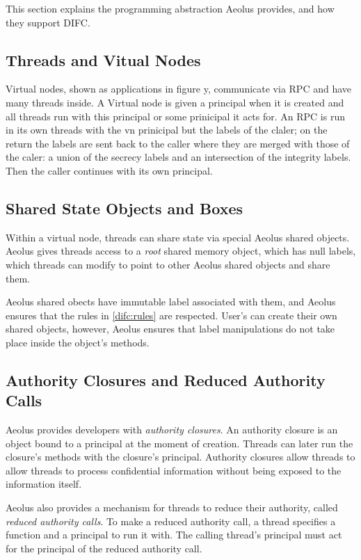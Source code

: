 This section explains the programming abstraction Aeolus provides, and how they support DIFC.

\subsection{Threads and Vitual Nodes}

Virtual nodes, shown as applications in figure y, communicate via RPC and have many threads inside. A Virtual node is given a principal when it is created and all threads run with this principal or some prinicipal it acts for. An RPC is run in its own threads with the vn prinicipal but the labels of the claler; on the return the labels are sent back to the caller where they are merged with those of the caler: a union of the secrecy labels and an intersection of the integrity labels. Then the caller continues with its own principal.

\subsection{Shared State Objects and Boxes}\label{aeolus:shared-mem}

Within a virtual node, threads can share state via special Aeolus shared objects. Aeolus gives threads access to a \emph{root} shared memory object, which has null labels, which threads can modify to point to other Aeolus shared objects and share them.

Aeolus shared obects have immutable label associated with them, and Aeolus ensures that the rules in \ref{difc:rules} are respected. User's can create their own shared objects, however, Aeolus ensures that label manipulations do not take place inside the object's methods.

\subsection{Authority Closures and Reduced Authority Calls}
\label{aeolus:auth-calls}

Aeolus provides developers with \emph{authority closures}. An authority closure is an object bound to a principal at the moment of creation. Threads can later run the closure's methods with the closure's principal. Authority closures allow threads to allow threads to process confidential information without being exposed to the information itself.

Aeolus also provides a mechanism for threads to reduce their authority, called \emph{reduced authority calls}. To make a reduced authority call, a thread specifies a function and a principal to run it with. The calling thread's principal must act for the principal of the reduced authority call.

